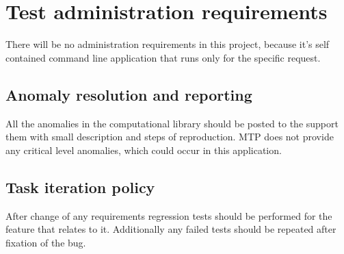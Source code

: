 \section{Test administration requirements} \label{s:details-of-the-master-test-plan:test-administration-requirements}
	\begin{comment}
		$<$ Describe the anomaly resolution and reporting processes, task iteration policy, deviation policy, control procedures and standards, practices, and conventions. These activities are needed to administer the tests during execution. $>$
	\end{comment}
	There will be no administration requirements in this project, because it's self contained command line application that runs only for the specific request.
\subsection{Anomaly resolution and reporting} \label{s:details-of-the-master-test-plan:anomaly-resolution-and-reporting}
	\begin{comment}
		$<$ Describe the method of reporting and resolving anomalies, including the standards for reporting an anomaly, the Anomaly Report distribution list, and the authority and time line for resolving anomalies. This section of the plan defines the anomaly criticality levels. Classification for software anomalies may be found in IEEE Std 1044TM-1993. $>$
	\end{comment}
	All the anomalies in the computational library should be posted to the support them with small description and steps of reproduction. \gls{MTP} does not provide any critical level anomalies, which could occur in this application.
\subsection{Task iteration policy} \label{s:details-of-the-master-test-plan:task-iteration-policy}
	\begin{comment}
		$<$ Describe the criteria used to determine the extent to which a testing task is repeated when its input is changed or task procedure is changed (e.g., reexecuting tests after anomalies have been fixed). These criteria may include assessments of change, integrity level, and effects on budget, schedule, and quality. $>$
	\end{comment}
	After change of any requirements regression tests should be performed for the feature that relates to it. Additionally any failed tests should be repeated after fixation of the bug. 
